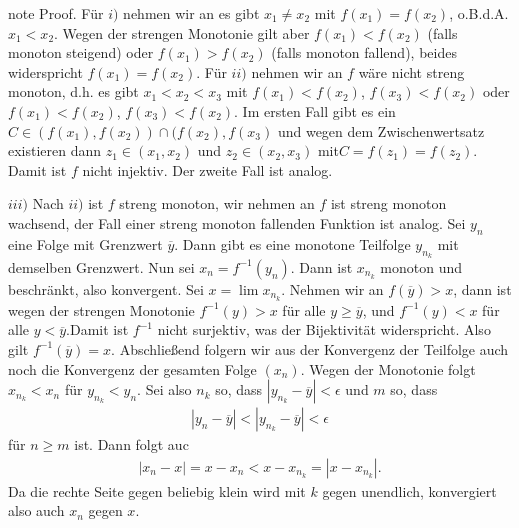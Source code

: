 \documentclass[letterpaper,10pt,english]{jupyterBook}
\begin{document}
\begin{sphinxadmonition}{note}
Proof.  Für \(i)\) nehmen wir an es gibt \(x_1 \neq x_2\) mit \(f(x_1) = f(x_2)\), o.B.d.A. \(x_1 < x_2\). Wegen der strengen Monotonie gilt aber \(f(x_1) < f(x_2)\) (falls monoton steigend) oder \(f(x_1) > f(x_2)\) (falls monoton fallend), beides widerspricht \(f(x_1) = f(x_2)\).
Für \(ii)\) nehmen wir an \(f\) wäre nicht streng monoton, d.h. es gibt \(x_1 < x_2 < x_3\) mit \(f(x_1) < f(x_2)\), \(f(x_3) < f(x_2)\) oder \(f(x_1) < f(x_2)\), \(f(x_3) < f(x_2)\). Im ersten Fall gibt es ein \(C \in (f(x_1),f(x_2)) \cap (f(x_2),f(x_3)\) und wegen dem Zwischenwertsatz existieren dann \(z_1 \in (x_1,x_2)\) und \(z_2 \in (x_2,x_3)\) mit\(C = f(z_1) = f(z_2)\). Damit ist \(f\) nicht injektiv. Der zweite Fall ist analog.

\(iii)\) Nach \(ii)\) ist \(f\) streng monoton, wir nehmen an \(f\) ist streng monoton wachsend, der Fall einer streng monoton fallenden Funktion ist analog. Sei \(y_n\) eine Folge mit Grenzwert \(\overline{y}\). Dann gibt es eine monotone Teilfolge \(y_{n_k}\) mit demselben Grenzwert. Nun sei \(x_n = f^{-1}(y_n)\). Dann ist \(x_{n_k}\) monoton und beschränkt, also konvergent. Sei \(x= \lim x_{n_k}\). Nehmen wir an \(f(\overline{y}) > x\), dann ist wegen der strengen Monotonie \(f^{-1}(y) > x\) für alle \(y \geq \overline{y}\), und \(f^{-1}(y) < x\) für alle \(y < \overline{y}\).Damit ist \(f^{-1}\) nicht surjektiv, was der Bijektivität widerspricht. Also gilt \(f^{-1}(\overline{y}) = x\). Abschließend folgern wir aus der Konvergenz der Teilfolge auch noch die Konvergenz der gesamten Folge \((x_n)\). Wegen der Monotonie folgt \(x_{n_k} < x_n\) für \(y_{n_k} < y_n\). Sei also \(n_k\) so, dass  \(|y_{n_k} - \overline{y}| < \epsilon\) und \(m\) so, dass
\begin{equation*}
\begin{split} |y_{n} - \overline{y}| < |y_{n_k} - \overline{y}| < \epsilon\end{split}
\end{equation*}
für \(n \geq m\) ist. Dann folgt auc
\begin{equation*}
\begin{split} |x_n - x|  = x - x_n < x-x_{n_k} = |x-x_{n_k}|.\end{split}
\end{equation*}
Da die rechte Seite gegen beliebig klein wird mit \(k\) gegen unendlich, konvergiert also auch \(x_n\) gegen \(x\).
\end{sphinxadmonition}
\end{document}
